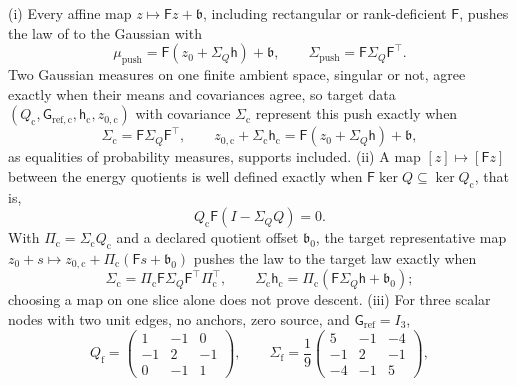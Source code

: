 (i) Every affine map \(z\mapsto\mathsf F z+\mathfrak b\), including rectangular or
rank-deficient \(\mathsf F\), pushes the law of
 to the Gaussian with
\begin{equation}
\mu_{\mathrm{push}}=\mathsf F(z_0+\Sigma_Q\mathsf h)+\mathfrak b,\qquad
\Sigma_{\mathrm{push}}=\mathsf F\Sigma_Q\mathsf F^\top .
\label{eq:cg-quotient-affine-push}
\end{equation}
Two Gaussian measures on one finite ambient space, singular or not, agree
exactly when their means and covariances agree, so target data
\((Q_{\mathrm c},\mathsf G_{\mathrm{ref,c}},\mathsf h_{\mathrm c},z_{0,\mathrm c})\) with
covariance \(\Sigma_{\mathrm c}\) represent this push exactly when
\begin{equation}
\Sigma_{\mathrm c}=\mathsf F\Sigma_Q\mathsf F^\top,\qquad
z_{0,\mathrm c}+\Sigma_{\mathrm c}\mathsf h_{\mathrm c}=\mathsf F(z_0+\Sigma_Q\mathsf h)+\mathfrak b,
\label{eq:cg-quotient-ambient-law-equality}
\end{equation}
as equalities of probability measures, supports included.
(ii) A map \([z]\mapsto[\mathsf F z]\) between the energy quotients is well defined
exactly when \(\mathsf F\ker Q\subseteq\ker Q_{\mathrm c}\), that is,
\begin{equation}
Q_{\mathrm c}\mathsf F(I-\Sigma_QQ)=0.
\label{eq:cg-quotient-map-descent}
\end{equation}
With \(\Pi_{\mathrm c}=\Sigma_{\mathrm c}Q_{\mathrm c}\) and a declared quotient
offset \(\mathfrak b_0\), the target representative map
\(z_0+s\mapsto z_{0,\mathrm c}+\Pi_{\mathrm c}(\mathsf F s+\mathfrak b_0)\) pushes the law
to the target law exactly when
\begin{equation}
\Sigma_{\mathrm c}=\Pi_{\mathrm c}\mathsf F\Sigma_Q\mathsf F^\top\Pi_{\mathrm c}^\top,\qquad
\Sigma_{\mathrm c}\mathsf h_{\mathrm c}=\Pi_{\mathrm c}(\mathsf F\Sigma_Q\mathsf h+\mathfrak b_0);
\label{eq:cg-quotient-intrinsic-law-equality}
\end{equation}
choosing a map on one slice alone does not prove descent.
(iii) For three scalar nodes with two unit edges, no anchors, zero source, and
\(\mathsf G_{\mathrm{ref}}=I_3\),
\begin{equation}
Q_{\mathrm f}=\begin{pmatrix}
1&-1&0\\-1&2&-1\\0&-1&1
\end{pmatrix},\qquad
\Sigma_{\mathrm f}=\frac19\begin{pmatrix}
5&-1&-4\\-1&2&-1\\-4&-1&5
\end{pmatrix},
\label{eq:cg-quotient-chain-data}
\end{equation}
